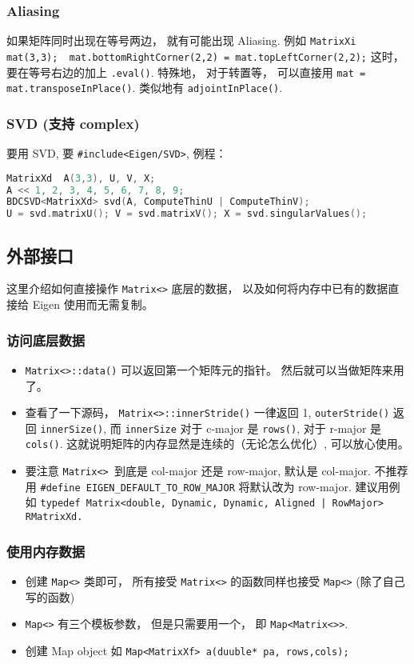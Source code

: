\subsubsection{Aliasing}
如果矩阵同时出现在等号两边， 就有可能出现 Aliasing. 例如 \verb`MatrixXi mat(3,3);  mat.bottomRightCorner(2,2) = mat.topLeftCorner(2,2);` 这时， 要在等号右边的加上 \verb`.eval()`. 特殊地， 对于转置等， 可以直接用 \verb`mat = mat.transposeInPlace()`. 类似地有 \verb`adjointInPlace()`.

\subsubsection{SVD (支持 complex)}
要用 SVD, 要 \verb`#include<Eigen/SVD>`, 例程：
\begin{lstlisting}[language=cpp]
MatrixXd  A(3,3), U, V, X;
A << 1, 2, 3, 4, 5, 6, 7, 8, 9;
BDCSVD<MatrixXd> svd(A, ComputeThinU | ComputeThinV);
U = svd.matrixU(); V = svd.matrixV(); X = svd.singularValues();
\end{lstlisting}

\subsection{外部接口}
这里介绍如何直接操作 \verb`Matrix<>` 底层的数据， 以及如何将内存中已有的数据直接给 Eigen 使用而无需复制。

\subsubsection{访问底层数据}
\begin{itemize}
\item \verb`Matrix<>::data()` 可以返回第一个矩阵元的指针。 然后就可以当做矩阵来用了。
\item 查看了一下源码， \verb`Matrix<>::innerStride()` 一律返回 1, \verb`outerStride()` 返回 \verb`innerSize()`, 而 \verb`innerSize` 对于 c-major 是 \verb`rows()`, 对于 r-major 是 \verb`cols()`. 这就说明矩阵的内存显然是连续的（无论怎么优化）, 可以放心使用。
\item 要注意 \verb`Matrix<> `到底是 col-major 还是 row-major, 默认是 col-major. 不推荐用 \verb`#define EIGEN_DEFAULT_TO_ROW_MAJOR` 将默认改为 row-major. 建议用例如 \verb`typedef Matrix<double, Dynamic, Dynamic, Aligned | RowMajor> RMatrixXd.`
\end{itemize}

\subsubsection{使用内存数据}
\begin{itemize}
\item 创建 \verb`Map<>` 类即可， 所有接受 \verb`Matrix<>` 的函数同样也接受 \verb`Map<>` (除了自己写的函数)
\item \verb`Map<>` 有三个模板参数， 但是只需要用一个， 即 \verb`Map<Matrix<>>`.
\item 创建 Map object 如 \verb`Map<MatrixXf> a(duuble* pa, rows,cols);`
\end{itemize}

